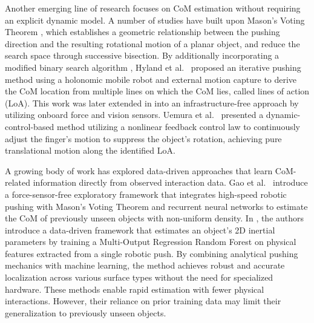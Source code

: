 Another emerging line of research focuses on CoM estimation without requiring an explicit dynamic model. A number of studies have built upon Mason’s Voting Theorem \cite{Mason1986Pushing}, which establishes a geometric relationship between the pushing direction and the resulting rotational motion of a planar object, and reduce the search space through successive bisection. By additionally incorporating a modified binary search algorithm \cite{Nowak2008Generalized}, Hyland et al.~\cite{Hyland2023CoM} proposed an iterative pushing method using a holonomic mobile robot and external motion capture to derive the CoM location from multiple lines on which the CoM lies, called lines of action (LoA). This work was later extended in \cite{Hyland2025Onboard} into an infrastructure-free approach by utilizing onboard force and vision sensors. Uemura et al.~\cite{Uemura2024Dynamic} presented a dynamic-control-based method utilizing a nonlinear feedback control law to continuously adjust the finger's motion to suppress the object’s rotation, achieving pure translational motion along the identified LoA.

A growing body of work has explored data-driven approaches that learn CoM-related information directly from observed interaction data. Gao et al.~\cite{Gao2023HighSpeed} introduce a force-sensor-free exploratory framework that integrates high-speed robotic pushing with Mason’s Voting Theorem and recurrent neural networks to estimate the CoM of previously unseen objects with non-uniform density. In \cite{Mavrakis2020DataDriven}, the authors introduce a data-driven framework that estimates an object's 2D inertial parameters by training a Multi-Output Regression Random Forest on physical features extracted from a single robotic push. By combining analytical pushing mechanics with machine learning, the method achieves robust and accurate localization across various surface types without the need for specialized hardware. These methods enable rapid estimation with fewer physical interactions. However, their reliance on prior training data may limit their generalization to previously unseen objects. 